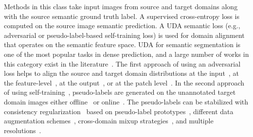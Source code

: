 \documentclass[10pt,twocolumn,letterpaper]{article}
\makeatletter
\renewcommand{\paragraph}{\@startsection{paragraph}{4}{\z@}{1.0ex \@plus 1ex \@minus .2ex}{-1em}{\normalfont\normalsize\bfseries}}
\makeatother
\begin{document}
\paragraph{UDA for Semantic Segmentation}
Methods in this class take input images from source and target domains along with the source semantic ground truth label.
A supervised cross-entropy loss is computed on the source image semantic prediction. 
A UDA semantic loss (e.g., adversarial \cite{vu2019advent} or pseudo-label-based self-training \cite{zou2018unsupervised} loss) is used for domain alignment that operates on the semantic feature space. 
UDA for semantic segmentation is one of the most popular tasks in dense prediction, and a large number of works in this category exist in the literature~\cite{
vu2019advent,tsai2018learning,hoffman2018cycada,li2019bidirectional,kim2020learning,zhou2021context,tranheden2021dacs,melas2021pixmatch,choi2019self,araslanov2021self,zhang2021prototypical,zou2018unsupervised,yang2020fda,wang2020differential,luo2019taking,du2019ssf,chen2018road,hoffman2016fcns,kang2020pixel,zhang2019category,liu2021learning,saha2021learning}. 
The first approach of using an adversarial loss helps to align the source and target domain distributions at the input~\cite{
hoffman2018cycada,gong2021dlow}, 
at the feature-level~\cite{
tsai2018learning,hoffman2016fcns}, 
at the output~\cite{
tsai2018learning,vu2019advent},
or at the patch level~\cite{tsai2019domain}.
In the second approach of using self-training~\cite{
zou2018unsupervised,li2019bidirectional,zhang2019category,zou2019confidence}, 
pseudo-labels are generated on the unannotated target domain images either offline~\cite{
sakaridis2018model,yang2020fda,zou2018unsupervised,zou2019confidence}
or online~\cite{
zhang2021prototypical,wang2021domain,tranheden2021dacs,zhou2021context,hoyer2021daformer,hoyer2022hrda}.
The pseudo-labels can be stabilized with consistency regularization~\cite{
tarvainen2017mean,sohn2020fixmatch} based on pseudo-label prototypes~\cite{zhang2021prototypical}, different data augmentation schemes~\cite{
araslanov2021self,choi2019self,melas2021pixmatch,hoyer2023mic}, cross-domain mixup strategies~\cite{
tranheden2021dacs,zhou2021context}, and multiple resolutions~\cite{hoyer2022hrda}.
\end{document}
